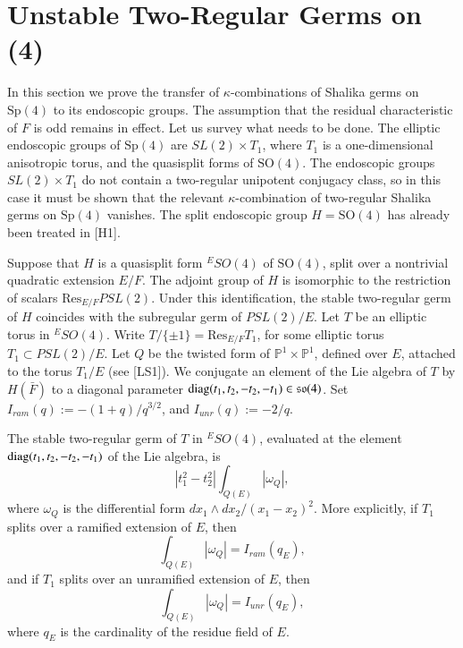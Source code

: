\documentclass{amsart}
\newcommand\bP{{\mathbb P}}
\newcommand\diag{\hbox{diag}}
\newcommand\so{{\mathfrak s\mathfrak o}}
\newcommand\bF{{\bar F}}
\newenvironment{cthm}[1]
  {\renewcommand\thethm{\bf #1}\thm}
  {\endthm}
\begin{document}
\section{Unstable Two-Regular Germs on (4)}

In this section we prove the transfer of $\kappa$-combinations
of Shalika germs on $\text{Sp}(4)$ to its endoscopic groups.
The assumption that the residual characteristic of $F$
is odd remains in effect.  Let
us survey what needs to be done.  The elliptic
endoscopic groups of $\text{Sp}(4)$ are $SL(2)\times T_1$, where
$T_1$ is a one-dimensional anisotropic torus, and the
quasisplit forms of $\text{SO}(4)$.  The endoscopic groups
$SL(2)\times T_1$ do not contain a two-regular unipotent
conjugacy class, so in this case it must be shown that
the relevant $\kappa$-combination of two-regular Shalika
germs on $\text{Sp}(4)$ vanishes.  The split endoscopic group
$H=\text{SO}(4)$ has already been treated in [H1].  

Suppose that
$H$ is a quasisplit form ${}^ESO(4)$ of $\text{SO}(4)$, split over
a nontrivial quadratic extension $E/F$.  The adjoint group
of $H$ is isomorphic to the restriction of scalars
$\text{Res}_{E/F}PSL(2)$.  Under this identification,
the stable two-regular germ
of $H$ coincides with the subregular germ of
$PSL(2)/E$.
Let $T$ be an elliptic torus in ${}^ESO(4)$.
Write $T/\{\pm1\} = \text{Res}_{E/F} T_1$, for some
elliptic torus $T_1\subset PSL(2)/E$.  Let $Q$ be the twisted form
of $\bP^1\times \bP^1$, defined over $E$, attached to the
torus $T_1/E$ (see [LS1]).  We conjugate an element of the
Lie algebra of $T$ by $H(\bF)$ to a diagonal parameter
$\diag(t_1,t_2,-t_2,-t_1)\in \so(4)$.
Set $I_{ram}(q):= -(1+q)/q^{3/2}$, and $I_{unr}(q):= -2/q$.

\bigskip
\noindent
\begin{cthm}{Lemma 5.1} The stable two-regular germ of $T$ in ${}^ESO(4)$,
evaluated at the element $\diag(t_1,t_2,-t_2,-t_1)$ of the
Lie algebra, is
$$|t_1^2-t_2^2| \int_{Q(E)} |\omega_Q|,$$
where $\omega_Q$ is the differential form $dx_1\wedge dx_2/(x_1-x_2)^2$.
More explicitly, if $T_1$ splits over a ramified
extension of $E$, then
$$\int_{Q(E)} |\omega_Q| = I_{ram}(q_E),$$
and if $T_1$ splits over an unramified extension of $E$, then
$$\int_{Q(E)} |\omega_Q| = I_{unr}(q_E),$$
where $q_E$ is the cardinality of the residue field of $E$.
\end{cthm}
\end{document}
